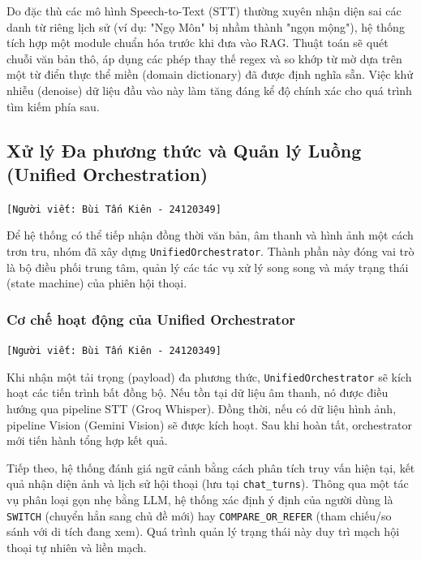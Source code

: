Do đặc thù các mô hình Speech-to-Text (STT) thường xuyên nhận diện sai các danh từ riêng lịch sử (ví dụ: "Ngọ Môn" bị nhầm thành "ngọn mộng"), hệ thống tích hợp một module chuẩn hóa trước khi đưa vào RAG. Thuật toán sẽ quét chuỗi văn bản thô, áp dụng các phép thay thế regex và so khớp từ mờ dựa trên một từ điển thực thể miền (domain dictionary) đã được định nghĩa sẵn. Việc khử nhiễu (denoise) dữ liệu đầu vào này làm tăng đáng kể độ chính xác cho quá trình tìm kiếm phía sau.

\subsection{Xử lý Đa phương thức và Quản lý Luồng (Unified Orchestration)}
\texttt{[Người viết: Bùi Tấn Kiên - 24120349]}

Để hệ thống có thể tiếp nhận đồng thời văn bản, âm thanh và hình ảnh một cách trơn tru, nhóm đã xây dựng \texttt{UnifiedOrchestrator}. Thành phần này đóng vai trò là bộ điều phối trung tâm, quản lý các tác vụ xử lý song song và máy trạng thái (state machine) của phiên hội thoại.

\subsubsection{Cơ chế hoạt động của Unified Orchestrator}
\texttt{[Người viết: Bùi Tấn Kiên - 24120349]}

Khi nhận một tải trọng (payload) đa phương thức, \texttt{UnifiedOrchestrator} sẽ kích hoạt các tiến trình bất đồng bộ. Nếu tồn tại dữ liệu âm thanh, nó được điều hướng qua pipeline STT (Groq Whisper). Đồng thời, nếu có dữ liệu hình ảnh, pipeline Vision (Gemini Vision) sẽ được kích hoạt. Sau khi hoàn tất, orchestrator mới tiến hành tổng hợp kết quả.

Tiếp theo, hệ thống đánh giá ngữ cảnh bằng cách phân tích truy vấn hiện tại, kết quả nhận diện ảnh và lịch sử hội thoại (lưu tại \texttt{chat\_turns}). Thông qua một tác vụ phân loại gọn nhẹ bằng LLM, hệ thống xác định ý định của người dùng là \texttt{SWITCH} (chuyển hẳn sang chủ đề mới) hay \texttt{COMPARE\_OR\_REFER} (tham chiếu/so sánh với di tích đang xem). Quá trình quản lý trạng thái này duy trì mạch hội thoại tự nhiên và liền mạch.

